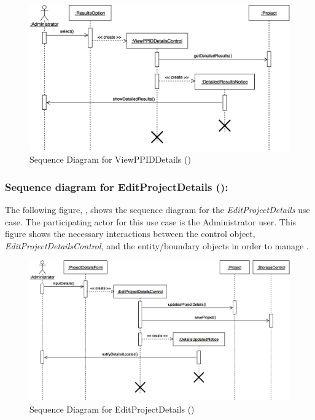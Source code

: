 \documentclass[12pt,letterpaper]{article}
\begin{document}
\begin{figure}[H]
	\centering{}
	\includegraphics[scale=0.25]{imgs/seq/view-ppid-details.png}
	\caption[ - Sequence Diagram for ViewPPIDDetails]{Sequence Diagram for ViewPPIDDetails ()}
\end{figure}

\subsubsection*{Sequence diagram for EditProjectDetails ():}

The following figure, , shows the sequence diagram for the {\it EditProjectDetails} use case. The participating actor for this use case is
the Administrator user. This figure shows the necessary interactions between the control object, {\it EditProjectDetailsControl}, and the
entity/boundary objects in order to manage .

\begin{figure}[H]
	\centering{}
	\includegraphics[scale=0.25]{imgs/seq/edit-project-details.png}
	\caption[ - Sequence Diagram for EditProjectDetails]{Sequence Diagram for EditProjectDetails ()}
\end{figure}
\end{document}
